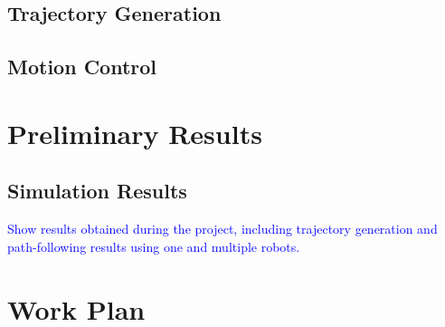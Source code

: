 \documentclass[a4paper, oneside]{article}
\begin{document}
    \subsection{Trajectory Generation}
    

    \subsection{Motion Control}
    

\clearpage
\section{Preliminary Results}

\subsection{Simulation Results}
\textcolor{blue}{Show results obtained during the project, including trajectory generation and path-following results using one and multiple robots.}

\clearpage
\section{Work Plan}

\nocite{*} %
\printbibliography[heading=bibintoc]

\appendix
\end{document}
